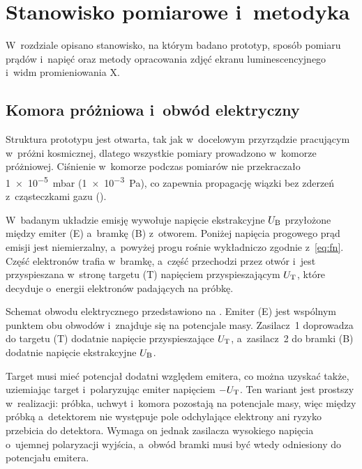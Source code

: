 \chapter{Stanowisko pomiarowe i~metodyka}
\label{ch:stanowisko}

W~rozdziale opisano stanowisko, na którym badano prototyp, sposób
pomiaru prądów i~napięć oraz metody opracowania zdjęć ekranu
luminescencyjnego i~widm promieniowania X.

\section{Komora próżniowa i~obwód elektryczny}
\label{sec:obwod}

\begin{zmiana}
Struktura prototypu jest otwarta, tak jak w~docelowym przyrządzie
pracującym w~próżni kosmicznej, dlatego wszystkie pomiary prowadzono
w~komorze próżniowej. Ciśnienie
w~komorze podczas pomiarów nie przekraczało \SI{1e-5}{\milli\bar}
(\SI{1e-3}{\pascal}), co zapewnia propagację wiązki bez zderzeń
z~cząsteczkami gazu ().
\end{zmiana}

\begin{przeniesione}
W~badanym układzie emisję wywołuje napięcie ekstrakcyjne $U_\mathrm{B}$
przyłożone między emiter (E) a~bramkę (B) z~otworem. Poniżej napięcia
progowego prąd emisji jest niemierzalny, a~powyżej progu rośnie
wykładniczo zgodnie z~\eqref{eq:fn}. Część elektronów trafia w~bramkę,
a~część przechodzi przez otwór i~jest przyspieszana w~stronę targetu (T)
napięciem przyspieszającym $U_\mathrm{T}$, które decyduje o~energii elektronów
padających na próbkę.
\end{przeniesione}

Schemat obwodu elektrycznego przedstawiono na .
Emiter (E) jest wspólnym punktem obu obwodów i~znajduje się na
potencjale masy. Zasilacz~1 doprowadza do targetu (T) dodatnie napięcie
przyspieszające $U_\mathrm{T}$, a~zasilacz~2 do bramki (B) dodatnie napięcie
ekstrakcyjne $U_\mathrm{B}$.
\begin{przeniesione}
Target musi mieć potencjał dodatni względem emitera, co można uzyskać
także, uziemiając target i~polaryzując emiter napięciem $-U_\mathrm{T}$. Ten
wariant jest prostszy w~realizacji: próbka, uchwyt i~komora pozostają
na potencjale masy, więc między próbką a~detektorem nie występuje pole
odchylające elektrony ani ryzyko przebicia do detektora. Wymaga on
jednak zasilacza wysokiego napięcia o~ujemnej polaryzacji wyjścia,
a~obwód bramki musi być wtedy odniesiony do potencjału emitera.
\end{przeniesione}

